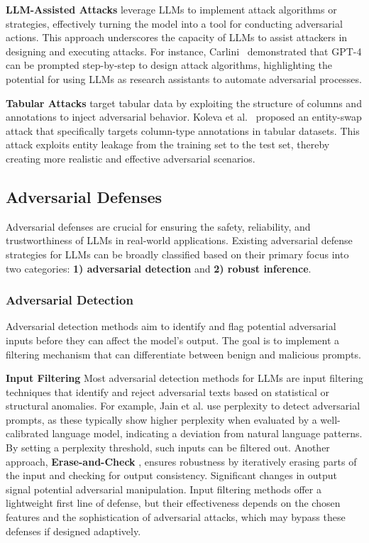 \textbf{LLM-Assisted Attacks} leverage LLMs to implement attack algorithms or strategies, effectively turning the model into a tool for conducting adversarial actions. This approach underscores the capacity of LLMs to assist attackers in designing and executing attacks. For instance, Carlini~\cite{carlini2023llm} demonstrated that GPT-4 can be prompted step-by-step to design attack algorithms, highlighting the potential for using LLMs as research assistants to automate adversarial processes.

\textbf{Tabular Attacks} target tabular data by exploiting the structure of columns and annotations to inject adversarial behavior. Koleva et al.~\cite{koleva2023adversarial} proposed an entity-swap attack that specifically targets column-type annotations in tabular datasets. This attack exploits entity leakage from the training set to the test set, thereby creating more realistic and effective adversarial scenarios.


\subsection{Adversarial Defenses} \label{sec:llm_adversarial_defense}
Adversarial defenses are crucial for ensuring the safety, reliability, and trustworthiness of LLMs in real-world applications. Existing adversarial defense strategies for LLMs can be broadly classified based on their primary focus into two categories: \textbf{1) adversarial detection} and \textbf{2) robust inference}.

\subsubsection{Adversarial Detection}
Adversarial detection methods aim to identify and flag potential adversarial inputs before they can affect the model's output. The goal is to implement a filtering mechanism that can differentiate between benign and malicious prompts.

\textbf{Input Filtering} Most adversarial detection methods for LLMs are input filtering techniques that identify and reject adversarial texts based on statistical or structural anomalies. For example, Jain et al. \cite{jain2023baseline} use perplexity to detect adversarial prompts, as these typically show higher perplexity when evaluated by a well-calibrated language model, indicating a deviation from natural language patterns. By setting a perplexity threshold, such inputs can be filtered out. Another approach, \textbf{Erase-and-Check} \cite{kumar2023certifying}, ensures robustness by iteratively erasing parts of the input and checking for output consistency. Significant changes in output signal potential adversarial manipulation.
Input filtering methods offer a lightweight first line of defense, but their effectiveness depends on the chosen features and the sophistication of adversarial attacks, which may bypass these defenses if designed adaptively.




